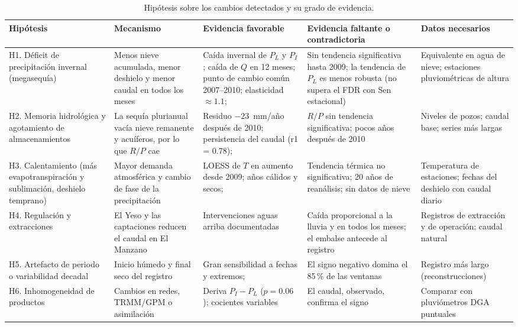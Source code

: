 \documentclass[11pt,letterpaper]{article}
\begin{document}
\begin{table}[H]
\centering\footnotesize
\caption{Hipótesis sobre los cambios detectados y su grado de evidencia.}
\label{tab:hipotesis}
\begin{tabularx}{\textwidth}{>{\raggedright\arraybackslash}p{2.4cm}>{\raggedright\arraybackslash}X>{\raggedright\arraybackslash}X>{\raggedright\arraybackslash}X>{\raggedright\arraybackslash}p{2.6cm}}
\toprule
Hipótesis & Mecanismo & Evidencia favorable & Evidencia faltante o contradictoria & Datos necesarios \\
\midrule
H1. Déficit de precipitación invernal (megasequía) & Menos nieve acumulada, menor deshielo y menor caudal en todos los meses & Caída invernal de $P_L$ y $P_I$; caída de $Q$ en 12 meses; punto de cambio común 2007--2010; elasticidad $\approx1.1$; \citep{Garreaud2017,Garreaud2020} & Sin tendencia significativa hasta 2009; la tendencia de $P_L$ es menos robusta (no supera el FDR con Sen estacional) & Equivalente en agua de nieve; estaciones pluviométricas de altura \\
H2. Memoria hidrológica y agotamiento de almacenamientos & La sequía plurianual vacía nieve remanente y acuíferos, por lo que $R/P$ cae & Residuo $-23$~mm/año después de 2010; persistencia del caudal (r1 = 0.78); \citep{AlvarezGarreton2021} & $R/P$ sin tendencia significativa; pocos años después de 2010 & Niveles de pozos; caudal base; series más largas \\
H3. Calentamiento (más evapotranspiración y sublimación, deshielo temprano) & Mayor demanda atmosférica y cambio de fase de la precipitación & LOESS de $T$ en aumento desde 2009; años cálidos y secos; \citep{Falvey2009} & Tendencia térmica no significativa; 20 años de reanálisis; sin datos de nieve & Temperatura de estaciones; fechas del deshielo con caudal diario \\
H4. Regulación y extracciones & El Yeso y las captaciones reducen el caudal en El Manzano & Intervenciones aguas arriba documentadas & Caída proporcional a la lluvia y en todos los meses; el embalse antecede al registro & Registros de extracción y de operación; caudal natural \\
H5. Artefacto de periodo o variabilidad decadal & Inicio húmedo y final seco del registro & Gran sensibilidad a fechas y extremos; \citep{Boisier2016,Garreaud2009} & El signo negativo domina el 85\,\% de las ventanas & Registro más largo (reconstrucciones) \\
H6. Inhomogeneidad de productos & Cambios en redes, TRMM/GPM o asimilación & Deriva $P_I-P_L$ ($p=0.06$); cocientes variables & El caudal, observado, confirma el signo & Comparar con pluviómetros DGA puntuales \\
\bottomrule
\end{tabularx}
\end{table}
\end{document}
